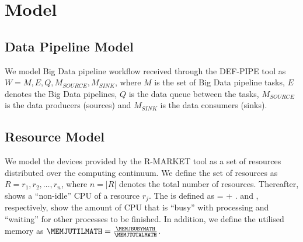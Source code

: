 \chapter{Model} %
\label{ch:model-methodology}



    \section{Data Pipeline Model}
    \label{sec:data-pipeline-model}

        We model Big Data pipeline workflow received through the DEF-PIPE tool as $W = M, E, Q, M_{SOURCE}, M_{SINK}$, where $M$ is the set of Big Data pipeline tasks, $E$ denotes the Big Data pipelines, $Q$ is the data queue between the tasks, $M_{SOURCE}$ is the data producers (sources) and $M_{SINK}$ is the data consumers (sinks).

    \section{Resource Model}
    \label{sec:resource-model}

        We model the devices provided by the R-MARKET tool as a set of resources distributed over the computing continuum. 
        We define the set of resources as $R = {r_1, r_2, \dots, r_n}$, where $n = | R |$ denotes the total number of resources. 
        Thereafter, \CPUJUTIL shows a “non-idle” CPU of a resource $r_j$. 
        The \CPUJUTIL  is defined as \CPUJUTIL  = \CPUJBUSY  + \CPUJWAIT. \CPUJBUSY  and  \CPUJWAIT, respectively, show the amount of CPU that is “busy” with processing and “waiting” for other processes to be finished. In addition, we define the utilised memory as $\MEMJUTILMATH = \frac{\MEMJBUSYMATH}{\MEMJTOTALMATH}$.




